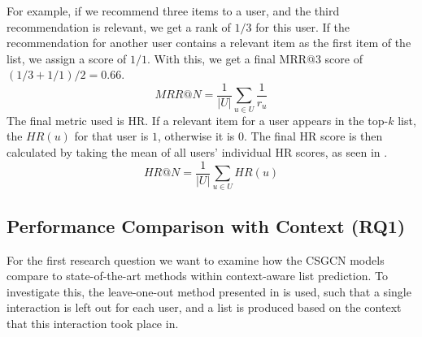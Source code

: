 For example, if we recommend three items to a user, and the third recommendation is relevant, we get a rank of $1/3$ for this user.
If the recommendation for another user contains a relevant item as the first item of the list, we assign a score of $1/1$.
With this, we get a final MRR@3 score of $(1/3 + 1/1) / 2 = 0.66$.
\begin{equation}
    \label{eqn:mrr}
    MRR@N = \frac{1}{|U|} \sum\limits_{u \in U}\frac{1}{r_u}
\end{equation}
The final metric used is HR.
If a relevant item for a user appears in the top-$k$ list, the $HR(u)$ for that user is $1$, otherwise it is $0$.
The final HR score is then calculated by taking the mean of all users' individual HR scores, as seen in .
\begin{equation}
    \label{eqn:hr}
    HR@N = \frac{1}{|U|} \sum\limits_{u \in U}HR(u)
\end{equation}

\subsection{Performance Comparison with Context (RQ1)}\label{subsec:rq1}
For the first research question we want to examine how the CSGCN models compare to state-of-the-art methods within context-aware list prediction.
To investigate this, the leave-one-out method presented in  is used, such that a single interaction is left out for each user, and a list is produced based on the context that this interaction took place in.

